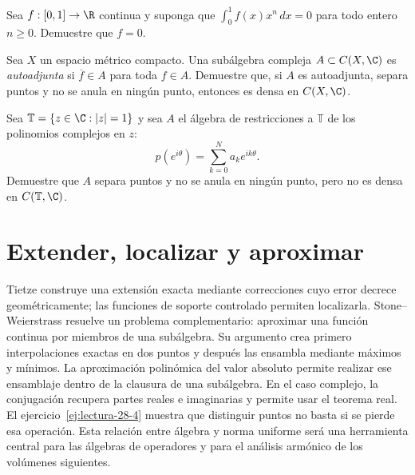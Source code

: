 \begin{ejercicio}\label{ej:lectura-28-2}
Sea $f:[0,1]\to\R$ continua y suponga que $\int_0^1 f(x)x^n\,dx=0$ para todo entero $n\ge0$. Demuestre que $f=0$.
\end{ejercicio}


\begin{ejercicio}\label{ej:lectura-28-3}
Sea $X$ un espacio métrico compacto. Una subálgebra compleja $A\subset C(X,\C)$ es \emph{autoadjunta} si $\overline f\in A$ para toda $f\in A$. Demuestre que, si $A$ es autoadjunta, separa puntos y no se anula en ningún punto, entonces es densa en $C(X,\C)$.
\end{ejercicio}


\begin{ejercicio}\label{ej:lectura-28-4}
Sea $\mathbb T=\{z\in\C:|z|=1\}$ y sea $A$ el álgebra de restricciones a $\mathbb T$ de los polinomios complejos en $z$:
\[
 p(e^{i\theta})=\sum_{k=0}^N a_ke^{ik\theta}.
\]
Demuestre que $A$ separa puntos y no se anula en ningún punto, pero no es densa en $C(\mathbb T,\C)$.
\end{ejercicio}


\section{Extender, localizar y aproximar}
Tietze construye una extensión exacta mediante correcciones cuyo error decrece geométricamente; las funciones de soporte controlado permiten localizarla. Stone--Weierstrass resuelve un problema complementario: aproximar una función continua por miembros de una subálgebra. Su argumento crea primero interpolaciones exactas en dos puntos y después las ensambla mediante máximos y mínimos. La aproximación polinómica del valor absoluto permite realizar ese ensamblaje dentro de la clausura de una subálgebra. En el caso complejo, la conjugación recupera partes reales e imaginarias y permite usar el teorema real. El ejercicio~\ref{ej:lectura-28-4} muestra que distinguir puntos no basta si se pierde esa operación. Esta relación entre álgebra y norma uniforme será una herramienta central para las álgebras de operadores y para el análisis armónico de los volúmenes siguientes.
